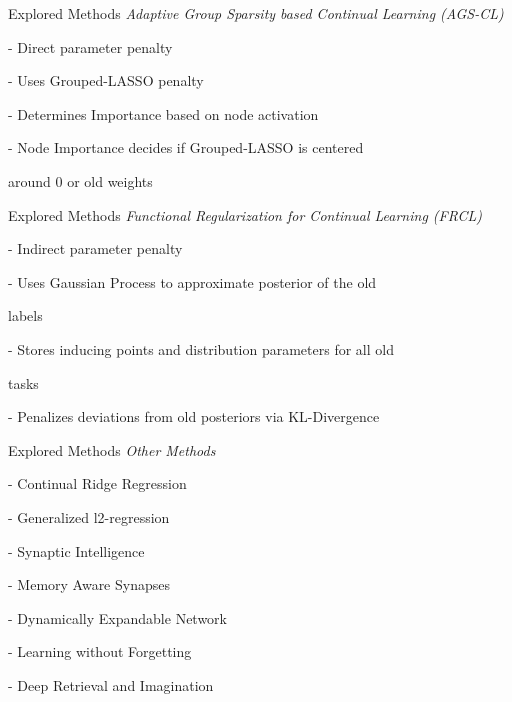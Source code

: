 \documentclass{beamer}
\begin{document}
\begin{frame}[t]{Explored Methods}
	\textit{Adaptive Group Sparsity based Continual Learning (AGS-CL) \cite{jung2021continuallearningnodeimportancebased}}
	
	\vspace{0.25cm}	
	\quad - Direct parameter penalty
	
	\vspace{0.25cm}
	\quad - Uses Grouped-LASSO penalty
	
	\vspace{0.25cm}	
	\quad - Determines Importance based on node activation 
	
	\vspace{0.25cm}
	\quad - Node Importance decides if Grouped-LASSO is centered 
	
	\quad around 0 or old weights

\end{frame}

\begin{frame}[t]{Explored Methods}
	\textit{Functional Regularization for Continual Learning (FRCL)\cite{titsias2020functionalregularisationcontinuallearning}}
	
	\vspace{0.25cm}	
	\quad - Indirect parameter penalty
	
	\vspace{0.25cm}	
	\quad - Uses Gaussian Process to approximate posterior of the old
	
	\quad labels
	
	\vspace{0.25cm}
	\quad - Stores inducing points and distribution parameters for all old 
	
	\quad tasks
	
	\vspace{0.25cm}
	\quad - Penalizes deviations from old posteriors via KL-Divergence

\end{frame}

\begin{frame}[t]{Explored Methods}
	\textit{Other Methods}
	
	\vspace{0.25cm}
	\quad - Continual Ridge Regression \cite{li2024fixeddesignanalysisregularizationbased}
	
	\quad - Generalized l2-regression \cite{zhao2024statisticaltheoryregularizationbasedcontinual}
	
	\quad - Synaptic Intelligence \cite{zenke2017continuallearningsynapticintelligence}
	
	\quad - Memory Aware Synapses \cite{aljundi2018memoryawaresynapseslearning}
	
	\quad - Dynamically Expandable Network \cite{yoon2018lifelonglearningdynamicallyexpandable}

	\quad - Learning without Forgetting \cite{li2017learningforgetting}

	\quad - Deep Retrieval and Imagination \cite{Wang_Liu_Duan_Tao_2022}

\end{frame}
\end{document}
